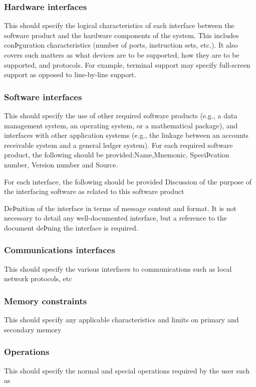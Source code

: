 		\subsubsection{Hardware interfaces}
			This should specify the logical characteristics of each interface between the software product and the hardware components of the system. This includes conÞguration characteristics (number of ports, instruction sets, etc.). It also covers such matters as what devices are to be supported, how they are to be supported, and protocols. For example, terminal support may specify full-screen support as opposed to line-by-line support.
		
		\subsubsection{Software interfaces}
			This should specify the use of other required software products (e.g., a data management system, an operating system, or a mathematical package), and interfaces with other application systems (e.g., the linkage between an accounts receivable system and a general ledger system). For each required software product, the following should be provided:Name,Mnemonic, SpeciÞcation number, Version number and Source.
			
		For each interface, the following should be provided
		Discussion of the purpose of the interfacing software as related to this software product
		
		DeÞnition of the interface in terms of message content and format. It is not necessary to detail any well-documented interface, but a reference to the document deÞning the interface is required.
		
		\subsubsection{Communications interfaces}
			This should specify the various interfaces to communications such as local network protocols, etc
		
		\subsubsection{Memory constraints}
			This should specify any applicable characteristics and limits on primary and secondary memory
		
		\subsubsection{Operations}
			This should specify the normal and special operations required by the user such as
			
